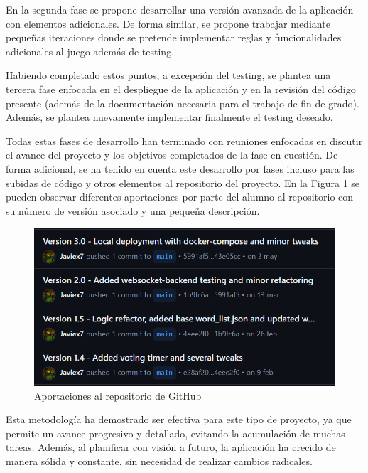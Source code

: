 En la segunda fase se propone desarrollar una versión avanzada de la aplicación con elementos adicionales. De forma similar, se propone trabajar
mediante pequeñas iteraciones donde se pretende implementar reglas y funcionalidades adicionales al juego además de testing.

Habiendo completado estos puntos, a excepción del testing, se plantea una tercera fase enfocada en el despliegue de la aplicación y en la 
revisión del código presente (además de la documentación necesaria para el trabajo de fin de grado). 
Además, se plantea  nuevamente implementar finalmente el testing deseado.

Todas estas fases de desarrollo han terminado con reuniones enfocadas en discutir el avance del proyecto y los objetivos
completados de la fase en cuestión. De forma adicional, se ha tenido en cuenta este desarrollo por fases incluso para las subidas
de código y otros elementos al repositorio del proyecto. En la Figura \ref{fig:res_commits} se pueden observar diferentes aportaciones 
por parte del alumno al repositorio con su número de versión asociado y una pequeña descripción.

\begin{figure}[h]
	\centering
	\includegraphics[width=\textwidth,clip=true]{res_commits.png}
	\caption{Aportaciones al repositorio de GitHub}
	\label{fig:res_commits}
\end{figure}

Esta metodología ha demostrado ser efectiva para este tipo de proyecto, ya que permite un avance progresivo y detallado,
evitando la acumulación de muchas tareas. Además, al planificar con visión a futuro, la aplicación ha crecido de manera sólida
y constante, sin necesidad de realizar cambios radicales.
